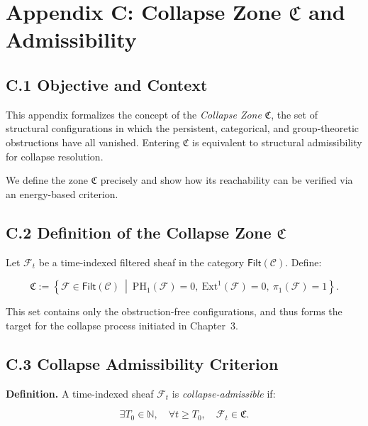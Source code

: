 \documentclass[11pt]{article}
\begin{document}
\appendix
\section*{Appendix C: Collapse Zone $\mathfrak{C}$ and Admissibility}

\subsection*{C.1 Objective and Context}

This appendix formalizes the concept of the \emph{Collapse Zone} \( \mathfrak{C} \), the set of structural configurations in which the persistent, categorical, and group-theoretic obstructions have all vanished. Entering \( \mathfrak{C} \) is equivalent to structural admissibility for collapse resolution.

We define the zone \( \mathfrak{C} \) precisely and show how its reachability can be verified via an energy-based criterion.

\subsection*{C.2 Definition of the Collapse Zone \( \mathfrak{C} \)}

Let \( \mathcal{F}_t \) be a time-indexed filtered sheaf in the category \( \mathsf{Filt}(\mathcal{C}) \). Define:

\[
\mathfrak{C} := \left\{ \mathcal{F} \in \mathsf{Filt}(\mathcal{C}) \ \middle| \
\mathrm{PH}_1(\mathcal{F}) = 0,\ 
\mathrm{Ext}^1(\mathcal{F}) = 0,\ 
\pi_1(\mathcal{F}) = 1
\right\}.
\]

This set contains only the obstruction-free configurations, and thus forms the target for the collapse process initiated in Chapter~3.

\subsection*{C.3 Collapse Admissibility Criterion}

\textbf{Definition.} A time-indexed sheaf \( \mathcal{F}_t \) is \emph{collapse-admissible} if:

\[
\exists T_0 \in \mathbb{N},\quad \forall t \geq T_0,\quad \mathcal{F}_t \in \mathfrak{C}.
\]
\end{document}
